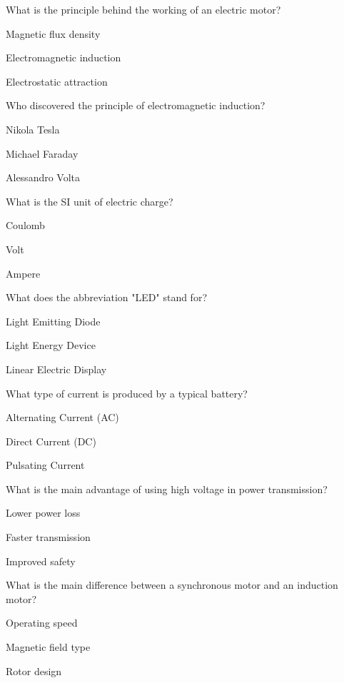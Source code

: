\begin{enhancedmcq}{What is the principle behind the working of an electric motor?}
\item Magnetic flux density
\item Electromagnetic induction
\item Electrostatic attraction

\end{enhancedmcq}
\begin{enhancedmcq}{Who discovered the principle of electromagnetic induction?}
\item Nikola Tesla
\item Michael Faraday
\item Alessandro Volta

\end{enhancedmcq}
\begin{enhancedmcq}{What is the SI unit of electric charge?}
\item Coulomb
\item Volt
\item Ampere

\end{enhancedmcq}
\begin{enhancedmcq}{What does the abbreviation "LED" stand for?}
\item Light Emitting Diode
\item Light Energy Device
\item Linear Electric Display

\end{enhancedmcq}
\begin{enhancedmcq}{What type of current is produced by a typical battery?}
\item Alternating Current (AC)
\item Direct Current (DC)
\item Pulsating Current

\end{enhancedmcq}
\begin{enhancedmcq}{What is the main advantage of using high voltage in power transmission?}
\item Lower power loss
\item Faster transmission
\item Improved safety

\end{enhancedmcq}
\begin{enhancedmcq}{What is the main difference between a synchronous motor and an induction motor?}
\item Operating speed
\item Magnetic field type
\item Rotor design

\end{enhancedmcq}
